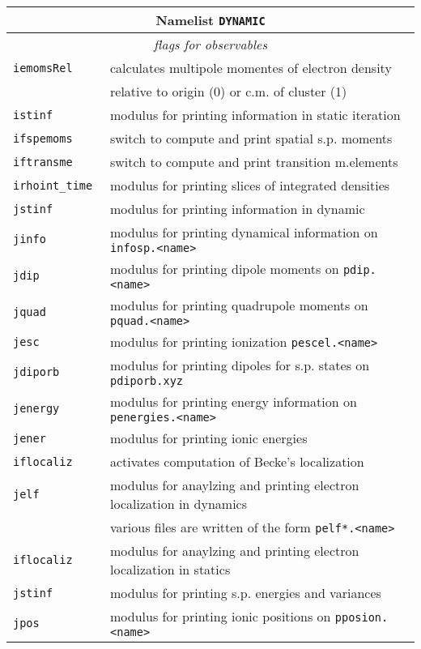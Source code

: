\documentclass[12pt]{article}
\begin{document}
\begin{tabular}{ll}
\hline
\multicolumn{2}{c}{Namelist {\tt DYNAMIC}} in {\tt for005.<name>} \\
\hline
\multicolumn{2}{c}{\it flags for observables} \\
\hline
{\tt iemomsRel        }& calculates multipole momentes of electron density \\
{\tt                  }& relative to origin (0) or c.m. of cluster (1)\\
{\tt istinf           }& modulus for printing information in static iteration \\
{\tt ifspemoms        }& switch to compute and print spatial s.p. moments\\
{\tt iftransme        }& switch to compute and print transition m.elements\\
{\tt irhoint\_time   }& modulus for printing slices of integrated densities\\
{\tt jstinf           }& modulus for printing information in dynamic \\
{\tt jinfo            }& modulus for printing dynamical information on {\tt
  infosp.<name>} \\
{\tt jdip             }& modulus for printing dipole moments on {\tt pdip.<name>}\\
{\tt jquad            }& modulus for printing quadrupole moments on {\tt pquad.<name>}\\
{\tt jesc            }& modulus for printing ionization {\tt pescel.<name>}\\
{\tt jdiporb} & modulus for printing dipoles for s.p. states on {\tt pdiporb.xyz} \\
{\tt jenergy          }& modulus for printing energy information on {\tt penergies.<name>} \\
{\tt jener} &  modulus for printing ionic energies\\
{\tt iflocaliz}        & activates computation of Becke's localization
\\
{\tt jelf}             & modulus for anaylzing and printing electron
localization in dynamics
\\
 & various files are written of the form {\tt pelf*.<name>}
\\
{\tt iflocaliz}             & modulus for anaylzing and printing electron
localization in statics
\\
{\tt jstinf}           & modulus for printing s.p. energies and variances
\\
{\tt jpos}           & modulus for printing ionic positions on {\tt pposion.<name>}

\end{tabular}
\end{document}
